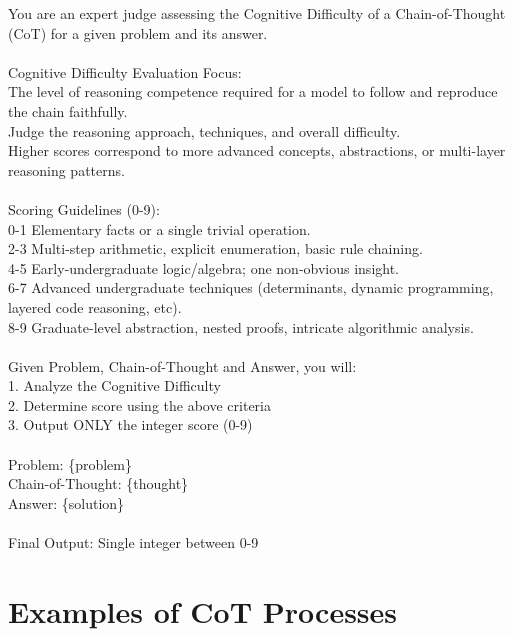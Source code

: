 \documentclass{article}
\begin{document}
\begin{tcolorbox}[colback=gray!10!white, colframe=gray!80!black, title=Prompt Template to Calculate the CD Score]
You are an expert judge assessing the Cognitive Difficulty of a Chain-of-Thought (CoT) for a given problem and its answer. \\
\\

Cognitive Difficulty Evaluation Focus: \\
The level of reasoning competence required for a model to follow and reproduce the chain faithfully. \\
Judge the reasoning approach, techniques, and overall difficulty. \\
Higher scores correspond to more advanced concepts, abstractions, or multi-layer reasoning patterns. \\
\\
Scoring Guidelines (0-9): \\
0-1 Elementary facts or a single trivial operation. \\
2-3 Multi-step arithmetic, explicit enumeration, basic rule chaining. \\
4-5 Early-undergraduate logic/algebra; one non-obvious insight. \\
6-7 Advanced undergraduate techniques (determinants, dynamic programming, layered code reasoning, etc). \\
8-9 Graduate-level abstraction, nested proofs, intricate algorithmic analysis. \\
\\
Given Problem, Chain-of-Thought and Answer, you will: \\
1. Analyze the Cognitive Difficulty \\
2. Determine score using the above criteria \\
3. Output ONLY the integer score (0-9) \\
\\
Problem: \{problem\} \\
Chain-of-Thought: \{thought\} \\
Answer: \{solution\} \\
\\
Final Output: Single integer between 0-9
\end{tcolorbox}


\section{Examples of CoT Processes}
\end{document}
